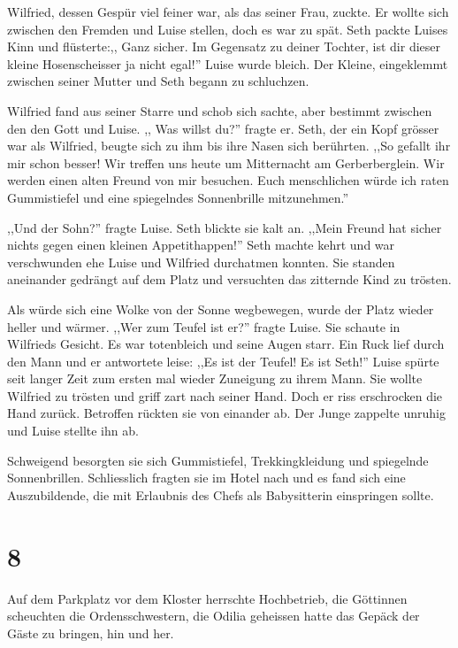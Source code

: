 Wilfried, dessen Gespür viel feiner war, als das seiner Frau, zuckte. Er wollte sich zwischen den Fremden und Luise stellen, doch es war zu spät. Seth packte Luises Kinn und flüsterte:,, Ganz sicher. Im Gegensatz zu deiner Tochter, ist dir dieser kleine Hosenscheisser ja nicht egal!'' Luise wurde bleich. Der Kleine, eingeklemmt zwischen seiner Mutter und Seth begann zu schluchzen.

Wilfried fand aus seiner Starre und schob sich sachte, aber bestimmt zwischen den den Gott und Luise. ,, Was willst du?'' fragte er. Seth, der ein Kopf grösser war als Wilfried, beugte sich zu ihm bis ihre Nasen sich berührten. ,,So gefallt ihr mir schon besser! Wir treffen uns heute um Mitternacht am Gerberberglein. Wir werden einen alten Freund von mir besuchen. Euch menschlichen würde ich raten Gummistiefel und eine spiegelndes Sonnenbrille mitzunehmen.''

,,Und der Sohn?'' fragte Luise. Seth blickte sie kalt an. ,,Mein  Freund hat sicher nichts gegen einen kleinen Appetithappen!'' Seth machte kehrt und war verschwunden ehe Luise und Wilfried durchatmen konnten. Sie standen aneinander gedrängt auf dem Platz und versuchten das zitternde Kind zu trösten.

Als würde sich eine Wolke von der Sonne wegbewegen, wurde der Platz wieder heller und wärmer. ,,Wer zum Teufel ist er?'' fragte Luise. Sie schaute in Wilfrieds Gesicht. Es war totenbleich und seine Augen starr. Ein Ruck lief durch den Mann und er antwortete leise: ,,Es ist der Teufel! Es ist Seth!'' Luise spürte seit langer Zeit zum ersten mal wieder Zuneigung zu ihrem Mann. Sie wollte Wilfried zu trösten und griff zart nach seiner Hand. Doch er riss erschrocken die Hand zurück. Betroffen rückten sie von einander ab. Der Junge zappelte unruhig und Luise stellte ihn ab.

Schweigend besorgten sie sich Gummistiefel, Trekkingkleidung und spiegelnde Sonnenbrillen. Schliesslich fragten sie im Hotel nach und es fand sich eine Auszubildende, die mit Erlaubnis des Chefs als Babysitterin einspringen sollte.


\section*{8}


Auf dem Parkplatz vor dem Kloster herrschte Hochbetrieb, die Göttinnen scheuchten die Ordensschwestern, die Odilia geheissen hatte das Gepäck der Gäste zu bringen, hin und her.

